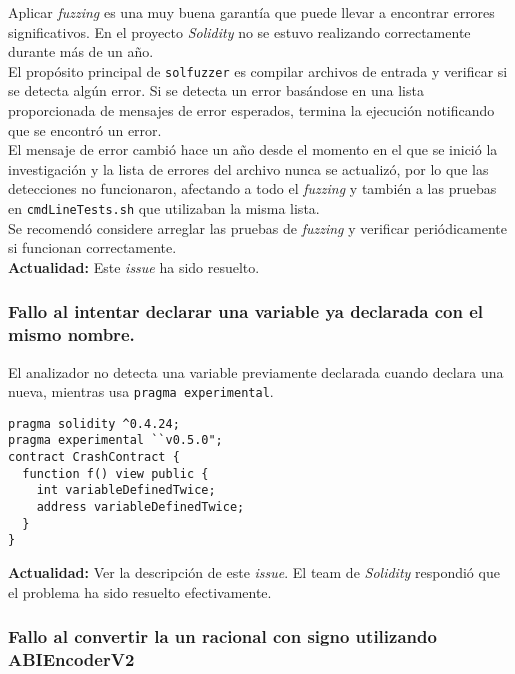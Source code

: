 Aplicar \textit{fuzzing} es una muy buena garantía que puede llevar a encontrar errores significativos. En el proyecto \textit{Solidity} no se estuvo realizando correctamente durante más de un año.\\

El propósito principal de \texttt{solfuzzer} es compilar archivos de entrada y verificar si se detecta algún error. Si se detecta un error basándose en una lista proporcionada de mensajes de error esperados, termina la ejecución notificando que se encontró un error.\\

El mensaje de error cambió hace un año desde el momento en el que se inició la investigación y la lista de errores del archivo nunca se actualizó, por lo que las detecciones no funcionaron, afectando a todo el \textit{fuzzing} y también a las pruebas en \texttt{cmdLineTests.sh}\cite{GHcmdlinetests} que utilizaban la misma lista.\\

Se recomendó considere arreglar las pruebas de \textit{fuzzing} y verificar periódicamente si funcionan correctamente.\\

\textbf{Actualidad:} Este \textit{issue}\cite{GHI4458} ha sido resuelto\cite{GHPR4461}.\\


\subsubsection{Fallo al intentar declarar una variable ya declarada con el mismo nombre.}

El analizador no detecta una variable previamente declarada cuando declara una nueva, mientras usa \texttt{pragma experimental}.\\

\begin{lstlisting}[language=Solidity, caption={Código de ejemplo variable mismo nombre.}]
pragma solidity ^0.4.24;
pragma experimental ``v0.5.0";
contract CrashContract {     
  function f() view public {
    int variableDefinedTwice;
    address variableDefinedTwice;
  }
}
\end{lstlisting}

\textbf{Actualidad:} Ver la descripción de este \textit{issue}\cite{GHI4705}. El team de \textit{Solidity} respondió que el problema ha sido resuelto efectivamente.\\

\subsubsection{Fallo al convertir la un racional con signo utilizando ABIEncoderV2}

